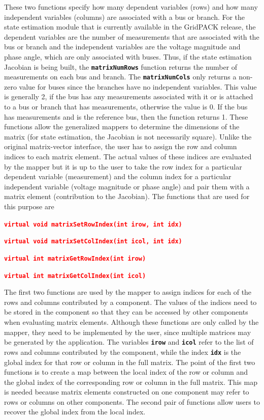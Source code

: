 \documentclass[12pt]{report} %
\begin{document}
These two functions specify how many dependent variables (rows) and how many independent variables (columns) are associated with a bus or branch. For the state estimation module that is currently available in the GridPACK release, the dependent variables are the  number of measurements that are associated with the bus or branch and the independent variables are the voltage magnitude and phase angle, which are only associated with buses. Thus, if the state estimation Jacobian is being built, the \texttt{\textbf{matrixNumRows}} function returns the number of measurements on each bus and branch. The \texttt{\textbf{matrixNumCols}} only returns a non-zero value for buses since the branches have no independent variables. This value is generally 2, if the bus has any measurements associated with it or is attached to a bus or branch that has measurements, otherwise the value is 0. If the bus has measurements and is the reference bus, then the function returns 1. These functions allow the generalized mappers to determine the dimensions of the matrix (for state estimation, the Jacobian is not necessarily square).
Unlike the original matrix-vector interface, the user has to assign the row and column indices to each matrix element. The actual values of these indices are evaluated by the mapper but it is up to the user to take the row index for a particular dependent variable (measurement) and the column index for a particular independent variable (voltage magnitude or phase angle) and pair them with a matrix element (contribution to the Jacobian). The functions that are used for this purpose are

\textcolor{red}{\texttt{\textbf{virtual void matrixSetRowIndex(int irow, int idx)}}}

\textcolor{red}{\texttt{\textbf{virtual void matrixSetColIndex(int icol, int idx)}}}

\textcolor{red}{\texttt{\textbf{virtual int matrixGetRowIndex(int irow)}}}

\textcolor{red}{\texttt{\textbf{virtual int matrixGetColIndex(int icol)}}}

The first two functions are used by the mapper to assign indices for each of the rows and columns contributed by a component. The values of the indices need to be stored in the component so that they can be accessed by other components when evaluating matrix elements. Although these functions are only called by the mapper, they need to be implemented by the user, since multiple matrices may be generated by the application. The variables \texttt{\textbf{irow}} and \texttt{\textbf{icol}} refer to the list of rows and columns contributed by the component, while the index \texttt{\textbf{idx}} is the global index for that row or column in the full matrix. The point of the first two functions is to create a map between the local index of the row or column and the global index of the corresponding row or column in the full matrix. This map is needed because matrix elements constructed on one component may refer to rows or columns on other components. The second pair of functions allow users to recover the global index from the local index.
\end{document}
